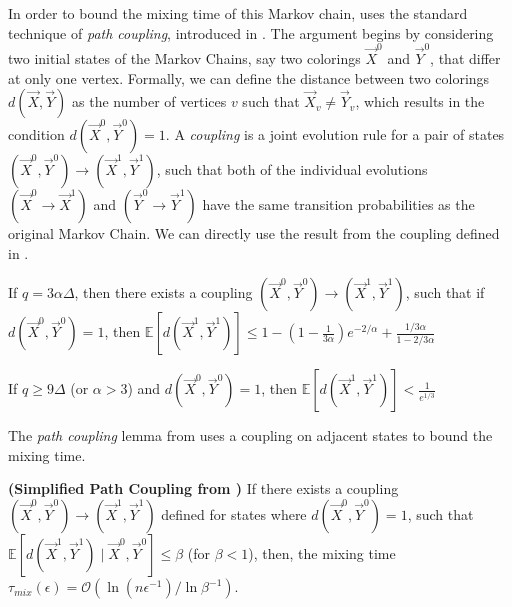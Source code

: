 In order to bound the mixing time of this Markov chain,
\cite{ghaffari_fischer} uses the standard technique of \emph{path coupling}, introduced in \cite{path_coupling}.
The argument begins by considering two initial states of the Markov Chains, say two colorings $\vec X^0$ and $\vec Y^0$,
that differ at only one vertex.
Formally, we can define the distance between two colorings $d(\vec X,\vec Y)$ as the number of vertices $v$ such that $\vec X_v\not= \vec Y_v$,
which results in the condition $d(\vec X^0, \vec Y^0) = 1$.
A \emph{coupling} is a joint evolution rule for a pair of states $(\vec X^0,\vec Y^0)\rightarrow(\vec X^1,\vec Y^1)$,
such that both of the individual evolutions $(\vec X^0\rightarrow \vec X^1)$ and $(\vec Y^0\rightarrow \vec Y^1)$
have the same transition probabilities as the original Markov Chain.
We can directly use the result from the coupling defined in \cite{ghaffari_fischer}.
\begin{lemma}
\label{lem:ghaffari_fischer_single_epoch_distance}
If $q = 3\alpha\Delta$, then there exists a coupling $(\vec X^0,\vec Y^0)\rightarrow(\vec X^1,\vec Y^1)$, such that if $d(\vec X^0, \vec Y^0) = 1$,
then $\mathbb E[d(\vec X^1,\vec Y^1)] \le 1-\left( 1-\frac1{3\alpha}\right)e^{-2/\alpha} + \frac{1/3\alpha}{1-2/3\alpha}$
\end{lemma}
\begin{corollary}
\label{cor:single_epoch_distansce}
If $q \ge 9\Delta$ (or $\alpha > 3$) and $d(\vec X^0, \vec Y^0) = 1$, then $\mathbb E[d(\vec X^1,\vec Y^1)] < \frac1{e^{1/3}}$
\end{corollary}

The \emph{path coupling} lemma from \cite{path_coupling} uses a coupling on adjacent states to bound the mixing time.
\begin{lemma}
\label{lem:path_coupling}
\textbf{(Simplified Path Coupling from \cite{path_coupling})}
If there exists a coupling $(\vec X^0,\vec Y^0)\rightarrow(\vec X^1,\vec Y^1)$ defined for states where $d(\vec X^0, \vec Y^0) = 1$,
such that $\mathbb{E}[d(\vec X^1, \vec Y^1) \mid \vec X^0, \vec Y^0] \le \beta$ (for $\beta < 1$),
then, the mixing time $\tau_{mix}(\epsilon) = \mathcal O(\ln (n\epsilon^{-1})/\ln \beta^{-1})$.
\end{lemma}

